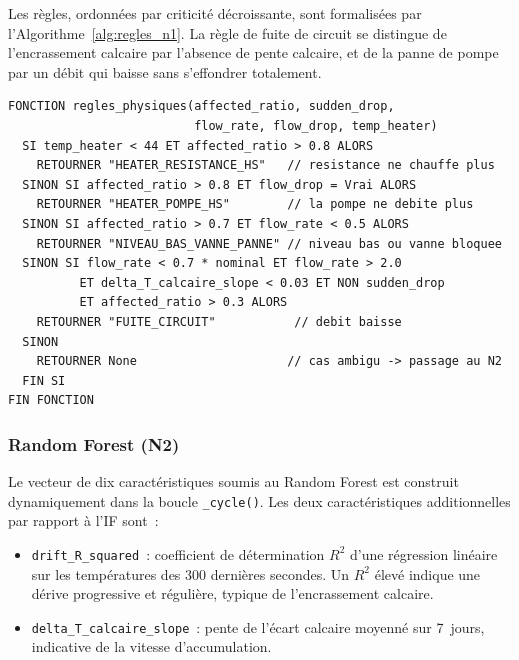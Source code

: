Les règles, ordonnées par criticité décroissante, sont formalisées par l'Algorithme~\ref{alg:regles_n1}. La règle de fuite de circuit se distingue de l'encrassement calcaire par l'absence de pente calcaire, et de la panne de pompe par un débit qui baisse sans s'effondrer totalement.

\begin{algorithm}[htbp]
\caption{Règles physiques de classification des causes (niveau N1)}
\label{alg:regles_n1}
\begin{minipage}{0.95\textwidth}
\begin{verbatim}
FONCTION regles_physiques(affected_ratio, sudden_drop,
                          flow_rate, flow_drop, temp_heater)
  SI temp_heater < 44 ET affected_ratio > 0.8 ALORS
    RETOURNER "HEATER_RESISTANCE_HS"   // resistance ne chauffe plus
  SINON SI affected_ratio > 0.8 ET flow_drop = Vrai ALORS
    RETOURNER "HEATER_POMPE_HS"        // la pompe ne debite plus
  SINON SI affected_ratio > 0.7 ET flow_rate < 0.5 ALORS
    RETOURNER "NIVEAU_BAS_VANNE_PANNE" // niveau bas ou vanne bloquee
  SINON SI flow_rate < 0.7 * nominal ET flow_rate > 2.0
          ET delta_T_calcaire_slope < 0.03 ET NON sudden_drop
          ET affected_ratio > 0.3 ALORS
    RETOURNER "FUITE_CIRCUIT"           // debit baisse
  SINON
    RETOURNER None                     // cas ambigu -> passage au N2
  FIN SI
FIN FONCTION
\end{verbatim}
\end{minipage}
\end{algorithm}

\subsubsection{Random Forest (N2)}

Le vecteur de dix caractéristiques soumis au Random Forest est construit dynamiquement dans la boucle \texttt{\_cycle()}. Les deux caractéristiques additionnelles par rapport à l'IF sont~:

\begin{itemize}
  \item \texttt{drift\_R\_squared}~: coefficient de détermination \(R^2\) d'une régression linéaire sur les températures des 300 dernières secondes. Un \(R^2\) élevé indique une dérive progressive et régulière, typique de l'encrassement calcaire.
  \item \texttt{delta\_T\_calcaire\_slope}~: pente de l'écart calcaire moyenné sur 7~jours, indicative de la vitesse d'accumulation.
\end{itemize}

